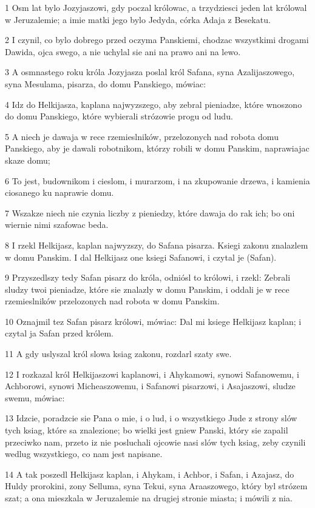 \par 1 Osm lat bylo Jozyjaszowi, gdy poczal królowac, a trzydziesci jeden lat królowal w Jeruzalemie; a imie matki jego bylo Jedyda, córka Adaja z Besekatu.
\par 2 I czynil, co bylo dobrego przed oczyma Panskiemi, chodzac wszystkimi drogami Dawida, ojca swego, a nie uchylal sie ani na prawo ani na lewo.
\par 3 A osmnastego roku króla Jozyjasza poslal król Safana, syna Azalijaszowego, syna Mesulama, pisarza, do domu Panskiego, mówiac:
\par 4 Idz do Helkijasza, kaplana najwyzszego, aby zebral pieniadze, które wnoszono do domu Panskiego, które wybierali strózowie progu od ludu.
\par 5 A niech je dawaja w rece rzemieslników, przelozonych nad robota domu Panskiego, aby je dawali robotnikom, którzy robili w domu Panskim, naprawiajac skaze domu;
\par 6 To jest, budownikom i cieslom, i murarzom, i na zkupowanie drzewa, i kamienia ciosanego ku naprawie domu.
\par 7 Wszakze niech nie czynia liczby z pieniedzy, które dawaja do rak ich; bo oni wiernie nimi szafowac beda.
\par 8 I rzekl Helkijasz, kaplan najwyzszy, do Safana pisarza. Ksiegi zakonu znalazlem w domu Panskim. I dal Helkijasz one ksiegi Safanowi, i czytal je (Safan).
\par 9 Przyszedlszy tedy Safan pisarz do króla, odniósl to królowi, i rzekl: Zebrali sludzy twoi pieniadze, które sie znalazly w domu Panskim, i oddali je w rece rzemieslników przelozonych nad robota w domu Panskim.
\par 10 Oznajmil tez Safan pisarz królowi, mówiac: Dal mi ksiege Helkijasz kaplan; i czytal ja Safan przed królem.
\par 11 A gdy uslyszal król slowa ksiag zakonu, rozdarl szaty swe.
\par 12 I rozkazal król Helkijaszowi kaplanowi, i Ahykamowi, synowi Safanowemu, i Achborowi, synowi Micheaszowemu, i Safanowi pisarzowi, i Asajaszowi, sludze swemu, mówiac:
\par 13 Idzcie, poradzcie sie Pana o mie, i o lud, i o wszystkiego Jude z strony slów tych ksiag, które sa znalezione; bo wielki jest gniew Panski, który sie zapalil przeciwko nam, przeto iz nie posluchali ojcowie nasi slów tych ksiag, zeby czynili wedlug wszystkiego, co nam jest napisane.
\par 14 A tak poszedl Helkijasz kaplan, i Ahykam, i Achbor, i Safan, i Azajasz, do Huldy prorokini, zony Selluma, syna Tekui, syna Araaszowego, który byl strózem szat; a ona mieszkala w Jeruzalemie na drugiej stronie miasta; i mówili z nia.
